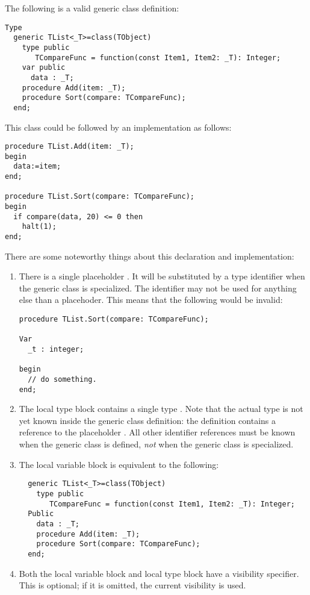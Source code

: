 The following is a valid generic class definition:
\begin{verbatim}
Type
  generic TList<_T>=class(TObject)
    type public
       TCompareFunc = function(const Item1, Item2: _T): Integer;
    var public
      data : _T;
    procedure Add(item: _T);
    procedure Sort(compare: TCompareFunc);
  end;
\end{verbatim}
This class could be followed by an implementation as follows:
\begin{verbatim}
procedure TList.Add(item: _T);
begin
  data:=item;
end;

procedure TList.Sort(compare: TCompareFunc);
begin
  if compare(data, 20) <= 0 then
    halt(1);
end;
\end{verbatim}
There are some noteworthy things about this declaration and implementation:
\begin{enumerate}
\item There is a single placeholder . It will be substituted by a
type identifier when the generic class is specialized. The identifier
 may not be used for anything else than a placehoder. This means
that the following would be invalid:
\begin{verbatim}
procedure TList.Sort(compare: TCompareFunc);

Var
  _t : integer;

begin
  // do something.
end;
\end{verbatim}
\item The local type block contains a single type . Note
that the actual type is not yet known inside the generic class definition:
the definition contains a reference to the placeholder . All other
identifier references must be known when the generic class is defined, {\em not}
when the generic class is specialized.
\item The local variable block is equivalent to the following:
\begin{verbatim}
  generic TList<_T>=class(TObject)
    type public
       TCompareFunc = function(const Item1, Item2: _T): Integer;
  Public  
    data : _T;
    procedure Add(item: _T);
    procedure Sort(compare: TCompareFunc);
  end;
\end{verbatim}
\item Both the local variable block and local type block have a visibility
specifier. This is optional; if it is omitted, the current visibility is
used.
\end{enumerate}

